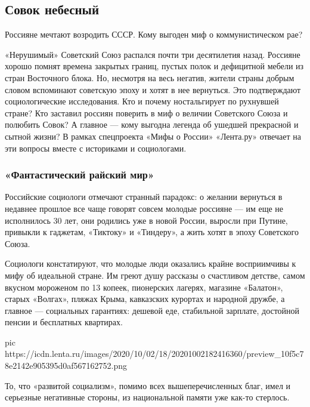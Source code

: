  
 

\subsection{Совок небесный}

Россияне мечтают возродить СССР. Кому выгоден миф о коммунистическом рае?

«Нерушимый» Советский Союз распался почти три десятилетия назад. Россияне
хорошо помнят времена закрытых границ, пустых полок и дефицитной мебели из
стран Восточного блока. Но, несмотря на весь негатив, жители страны добрым
словом вспоминают советскую эпоху и хотят в нее вернуться. Это подтверждают
социологические исследования. Кто и почему ностальгирует по рухнувшей стране?
Кто заставил россиян поверить в миф о величии Советского Союза и полюбить
Совок? А главное — кому выгодна легенда об ушедшей прекрасной и сытной жизни? В
рамках спецпроекта «Мифы о России» «Лента.ру» отвечает на эти вопросы вместе с
историками и социологами.

\subsubsection{«Фантастический райский мир»}

Российские социологи отмечают странный парадокс: о желании вернуться в недавнее
прошлое все чаще говорят совсем молодые россияне — им еще не исполнилось 30
лет, они родились уже в новой России, выросли при Путине, привыкли к гаджетам,
«Тиктоку» и «Тиндеру», а жить хотят в эпоху Советского Союза.

Социологи констатируют, что молодые люди оказались крайне восприимчивы к мифу
об идеальной стране. Им греют душу рассказы о счастливом детстве, самом вкусном
мороженом по 13 копеек, пионерских лагерях, магазине «Балатон», старых
«Волгах», пляжах Крыма, кавказских курортах и народной дружбе, а главное —
социальных гарантиях: дешевой еде, стабильной зарплате, достойной пенсии и
бесплатных квартирах.

\ifcmt
pic https://icdn.lenta.ru/images/2020/10/02/18/20201002182416360/preview_10f5c78e2142e905395d0af567162752.png
\fi

То, что «развитой социализм», помимо всех вышеперечисленных благ, имел и
серьезные негативные стороны, из национальной памяти уже как-то стерлось.

